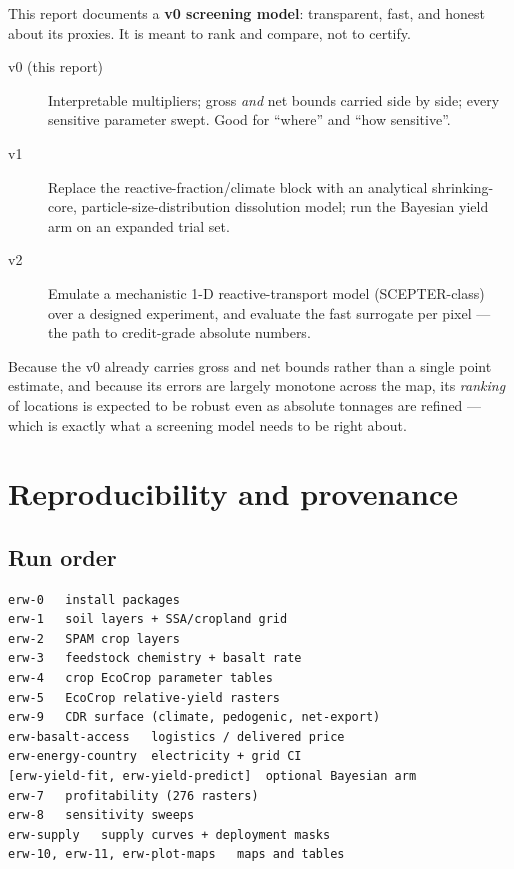 \documentclass[openany]{book}
\begin{document}
\begin{keybox}
This report documents a \textbf{v0 screening model}: transparent, fast, and
honest about its proxies. It is meant to rank and compare, not to certify.
\end{keybox}

\begin{description}
\item[v0 (this report)] Interpretable multipliers; gross \emph{and} net bounds
carried side by side; every sensitive parameter swept. Good for ``where'' and
``how sensitive''.
\item[v1] Replace the reactive-fraction/climate block with an analytical
shrinking-core, particle-size-distribution dissolution model; run the Bayesian
yield arm on an expanded trial set.
\item[v2] Emulate a mechanistic 1-D reactive-transport model (SCEPTER-class) over
a designed experiment, and evaluate the fast surrogate per pixel --- the path to
credit-grade absolute numbers.
\end{description}

Because the v0 already carries gross and net bounds rather than a single point
estimate, and because its errors are largely monotone across the map, its
\emph{ranking} of locations is expected to be robust even as absolute tonnages
are refined --- which is exactly what a screening model needs to be right about.

\chapter{Reproducibility and provenance}\label{ch:repro}

\section{Run order}

\begin{verbatim}
erw-0   install packages
erw-1   soil layers + SSA/cropland grid
erw-2   SPAM crop layers
erw-3   feedstock chemistry + basalt rate
erw-4   crop EcoCrop parameter tables
erw-5   EcoCrop relative-yield rasters
erw-9   CDR surface (climate, pedogenic, net-export)
erw-basalt-access   logistics / delivered price
erw-energy-country  electricity + grid CI
[erw-yield-fit, erw-yield-predict]  optional Bayesian arm
erw-7   profitability (276 rasters)
erw-8   sensitivity sweeps
erw-supply   supply curves + deployment masks
erw-10, erw-11, erw-plot-maps   maps and tables
\end{verbatim}
\end{document}
